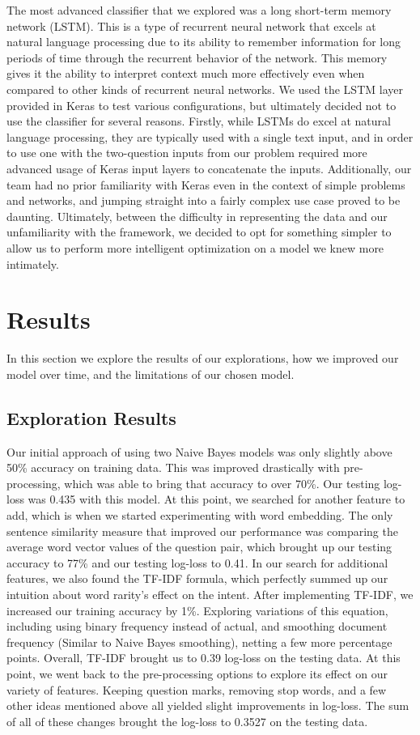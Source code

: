 \documentclass{article}
\begin{document}
The most advanced classifier that we explored was a long short-term memory
network (LSTM). This is a type of recurrent neural network that excels at
natural language processing due to its ability to remember information for long
periods of time through the recurrent behavior of the network. This memory gives
it the ability to interpret context much more effectively even when compared to
other kinds of recurrent neural networks. We used the LSTM layer provided in
Keras to test various configurations, but ultimately decided not to use the
classifier for several reasons. Firstly, while LSTMs do excel at natural
language processing, they are typically used with a single text input, and in
order to use one with the two-question inputs from our problem required more
advanced usage of Keras input layers to concatenate the inputs. Additionally,
our team had no prior familiarity with Keras even in the context of simple
problems and networks, and jumping straight into a fairly complex use case
proved to be daunting. Ultimately, between the difficulty in representing the
data and our unfamiliarity with the framework, we decided to opt for something
simpler to allow us to perform more intelligent optimization on a model we knew
more intimately.

\section{Results}

In this section we explore the results of our explorations, how we improved our
model over time, and the limitations of our chosen model.

\subsection{Exploration Results}

Our initial approach of using two Naive Bayes models was only slightly above
50\% accuracy on training data. This was improved drastically with
pre-processing, which was able to bring that accuracy to over 70\%. Our testing
log-loss was 0.435 with this model. At this point, we searched for another
feature to add, which is when we started experimenting with word embedding. The
only sentence similarity measure that improved our performance was comparing the
average word vector values of the question pair, which brought up our testing
accuracy to 77\% and our testing log-loss to 0.41. In our search for additional
features, we also found the TF-IDF formula, which perfectly summed up our
intuition about word rarity’s effect on the intent. After implementing TF-IDF,
we increased our training accuracy by 1\%. Exploring variations of this
equation, including using binary frequency instead of actual, and smoothing
document frequency (Similar to Naive Bayes smoothing), netting a few more
percentage points. Overall, TF-IDF brought us to 0.39 log-loss on the testing
data. At this point, we went back to the pre-processing options to explore its
effect on our variety of features. Keeping question marks, removing stop words,
and a few other ideas mentioned above all yielded slight improvements in
log-loss. The sum of all of these changes brought the log-loss to 0.3527 on the
testing data.
\end{document}
